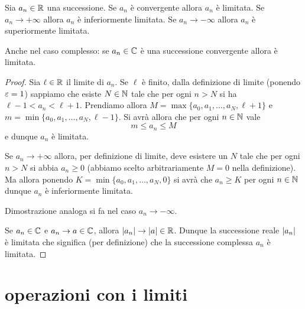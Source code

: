 \begin{theorem}
\mymark{**}
Sia $a_n\in\mathbb R$ una successione.
Se $a_n$ è convergente allora $a_n$ è limitata.
Se $a_n\to +\infty$ allora $a_n$ è inferiormente limitata.
Se $a_n\to -\infty$ allora $a_n$ è superiormente limitata.

Anche nel caso complesso:
se $a_n\in \mathbb C$ è una successione convergente allora è
limitata.
\end{theorem}
%
\begin{proof}
Sia $\ell \in \mathbb R$ il limite di $a_n$.
Se $\ell$ è finito,
dalla definizione di limite (ponendo $\varepsilon=1$) sappiamo che esiste $N\in \mathbb N$
tale che per ogni $n> N$ si ha $\ell -1 < a_n < \ell+ 1$.
Prendiamo allora $M=\max\{a_0, a_1, \dots, a_N, \ell +1\}$
e $m =\min \{a_0, a_1, \dots, a_N, \ell-1\}$. Si avrà allora
che per ogni $n\in \mathbb N$ vale
\[
  m \le a_n \le M
\]
e dunque $a_n$ è limitata.

Se $a_n \to +\infty$ allora, per definizione di limite, deve esistere un $N$
tale che per ogni $n>N$ si abbia $a_n \ge 0$ (abbiamo scelto arbitrariamente
$M=0$ nella definizione). Ma allora ponendo $K=\min\{a_0, a_1, \dots, a_N, 0\}$
si avrà che $a_n\ge K$ per ogni $n\in \mathbb N$ dunque $a_n$ è inferiormente
limitata.

Dimostrazione analoga si fa nel caso $a_n \to -\infty$.

Se $a_n\in \mathbb C$ e $a_n\to a\in \mathbb C$, allora ${\left|a_n\right|}\to {\left|a\right|}\in \mathbb R$.
Dunque la successione reale ${\left|a_n\right|}$ è limitata che significa (per definizione)
che la successione complessa $a_n$ è limitata.
\end{proof}

\section{operazioni con i limiti}

